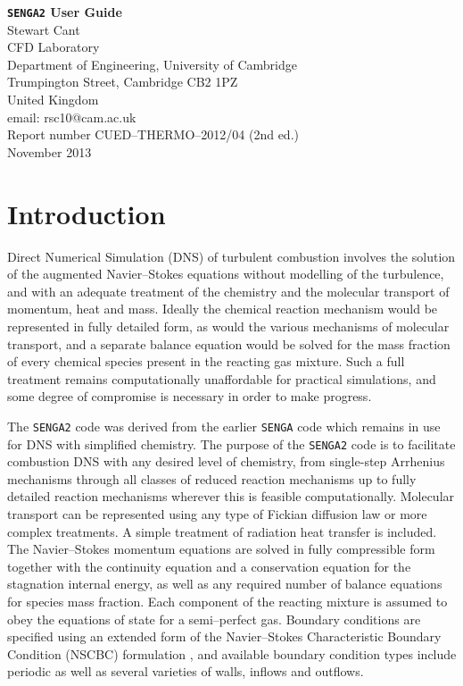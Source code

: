 \documentclass[dvips]{article}
\begin{document}
\vspace{40mm}
\begin{center}
{\Large \bf{{\tt SENGA2} User Guide}}\\[5mm]
{\large Stewart Cant}\\[5mm]
{\large CFD Laboratory}\\[1mm]
{\large Department of Engineering, University of Cambridge}\\[1mm]
{\large Trumpington Street, Cambridge CB2 1PZ}\\[1mm]
{\large United Kingdom}\\[1mm]
{\large email: rsc10@cam.ac.uk}\\[7mm]
Report number CUED--THERMO--2012/04 (2nd ed.)\\[1mm]
November 2013
\end{center}

\newpage
\section{Introduction}
Direct Numerical Simulation (DNS) of turbulent combustion involves the
solution of the augmented Navier--Stokes equations without modelling of the
turbulence, and with an adequate treatment of the chemistry and the molecular
transport of momentum, heat and mass.  Ideally the chemical
reaction mechanism would be represented in fully detailed form, as
would the various mechanisms of molecular transport, and a separate
balance equation would be solved for the mass fraction of every chemical
species present in the reacting gas mixture.  Such a full treatment
remains computationally unaffordable for practical simulations,
and some degree of compromise is necessary in order to make progress. 

The {\tt SENGA2} code was derived from the earlier {\tt SENGA} code
\cite{JenkinsCant} which remains in use for DNS with simplified chemistry.  The
purpose of the {\tt SENGA2} code is to facilitate combustion DNS with any
desired level of chemistry, from single-step Arrhenius mechanisms through all
classes of reduced reaction mechanisms up to fully detailed reaction
mechanisms wherever this is feasible computationally.
Molecular transport can be represented using any type of Fickian
diffusion law or more complex treatments.  A simple treatment of radiation heat
transfer is included.  The Navier--Stokes momentum equations
are solved in fully compressible form together with the continuity
equation and a conservation equation for the stagnation internal energy,
as well as any required number of balance equations for species mass fraction.  
Each component of the reacting mixture is assumed to obey the equations of
state for a semi--perfect gas.  Boundary conditions are specified using
an extended form of the Navier--Stokes Characteristic Boundary Condition (NSCBC)
formulation \cite{PoinsotLele, SutherlandKennedy}, and available boundary
condition types include periodic as well as several varieties of walls,
inflows and outflows.
\end{document}

